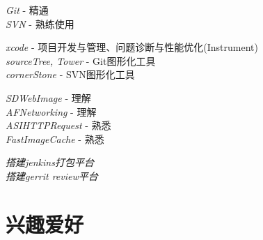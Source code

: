 \documentclass[10pt]{article} %
\begin{document}

{
\textit{Git} - 精通\\
\textit{SVN} - 熟练使用\\
}


{
\textit{xcode} - 项目开发与管理、问题诊断与性能优化(Instrument)\\
\textit{sourceTree, Tower} - Git图形化工具\\
\textit{cornerStone} - SVN图形化工具\\
}

{
\textit{SDWebImage}     - 理解\\
\textit{AFNetworking}   - 理解\\
\textit{ASIHTTPRequest} - 熟悉\\
\textit{FastImageCache} - 熟悉\\
}

{
\textit{搭建jenkins打包平台}\\
\textit{搭建gerrit review平台}\\
}


\section{兴趣爱好}


\end{document}

